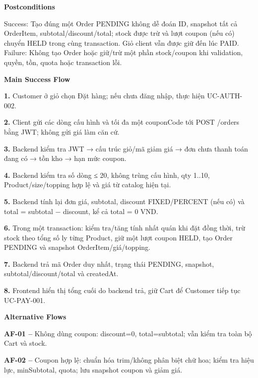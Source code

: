 \documentclass[11pt,a4paper,oneside]{report}
\begin{document}
\par\smallskip\noindent\textcolor{sgublue}{\textbf{Postconditions}}\par\nobreak
Success: Tạo đúng một Order PENDING không dễ đoán ID, snapshot tất cả OrderItem, subtotal/discount/total; stock được trừ và lượt coupon (nếu có) chuyển HELD trong cùng transaction. Giỏ client vẫn được giữ đến lúc PAID.\\
Failure: Không tạo Order hoặc giữ/trừ một phần stock/coupon khi validation, quyền, tồn, quota hoặc transaction lỗi.\strut
\par

\par\smallskip\noindent\textcolor{sgublue}{\textbf{Main Success Flow}}\par\nobreak
\textbf{1.} Customer ở giỏ chọn Đặt hàng; nếu chưa đăng nhập, thực hiện UC-AUTH-002.

\textbf{2.} Client gửi các dòng cấu hình và tối đa một couponCode tới POST /orders bằng JWT; không gửi giá làm căn cứ.

\textbf{3.} Backend kiểm tra JWT → cấu trúc giỏ/mã giảm giá → đơn chưa thanh toán đang có → tồn kho → hạn mức coupon.

\textbf{4.} Backend kiểm tra số dòng ≤ 20, không trùng cấu hình, qty 1..10, Product/size/topping hợp lệ và giá từ catalog hiện tại.

\textbf{5.} Backend tính lại đơn giá, subtotal, discount FIXED/PERCENT (nếu có) và total = subtotal − discount, kể cả total = 0 VND.

\textbf{6.} Trong một transaction: kiểm tra/tăng tính nhất quán khi đặt đồng thời, trừ stock theo tổng số ly từng Product, giữ một lượt coupon HELD, tạo Order PENDING và snapshot OrderItem/giá/topping.

\textbf{7.} Backend trả mã Order duy nhất, trạng thái PENDING, snapshot, subtotal/discount/total và createdAt.

\textbf{8.} Frontend hiển thị tổng cuối do backend trả, giữ Cart để Customer tiếp tục UC-PAY-001.
\par

\par\smallskip\noindent\textcolor{sgublue}{\textbf{Alternative Flows}}\par\nobreak
\textbf{AF-01 --} Không dùng coupon: discount=0, total=subtotal; vẫn kiểm tra toàn bộ Cart và stock.

\textbf{AF-02 --} Coupon hợp lệ: chuẩn hóa trim/không phân biệt chữ hoa; kiểm tra hiệu lực, minSubtotal, quota; lưu snapshot coupon và giảm giá.
\end{document}
